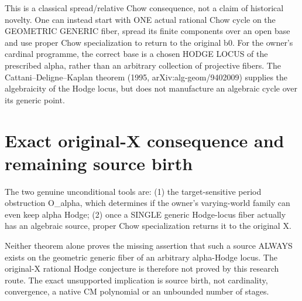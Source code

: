 \documentclass[11pt]{article}
\begin{document}
This is a classical spread/relative Chow consequence,
not a claim of historical novelty. One can instead
start with ONE actual rational Chow cycle on the
GEOMETRIC GENERIC fiber, spread its finite components
over an open base and use proper Chow specialization
to return to the original b0.
For the owner's cardinal programme, the correct base
is a chosen HODGE LOCUS of the prescribed alpha,
rather than an arbitrary collection of projective fibers.
The Cattani--Deligne--Kaplan theorem
(1995, arXiv:alg-geom/9402009) supplies the algebraicity
of the Hodge locus, but does not manufacture
an algebraic cycle over its generic point.

\section{Exact original-X consequence and remaining source birth}
The two genuine unconditional tools are:
(1) the target-sensitive period obstruction O_alpha,
which determines if the owner's varying-world family
can even keep alpha Hodge;
(2) once a SINGLE generic Hodge-locus fiber actually
has an algebraic source, proper Chow specialization
returns it to the original X.

Neither theorem alone proves the missing assertion
that such a source ALWAYS exists on the geometric
generic fiber of an arbitrary alpha-Hodge locus.
The original-X rational Hodge conjecture is
therefore not proved by this research route.
The exact unsupported implication is source birth,
not cardinality, convergence, a native
CM polynomial or an unbounded number of stages.
\end{document}
